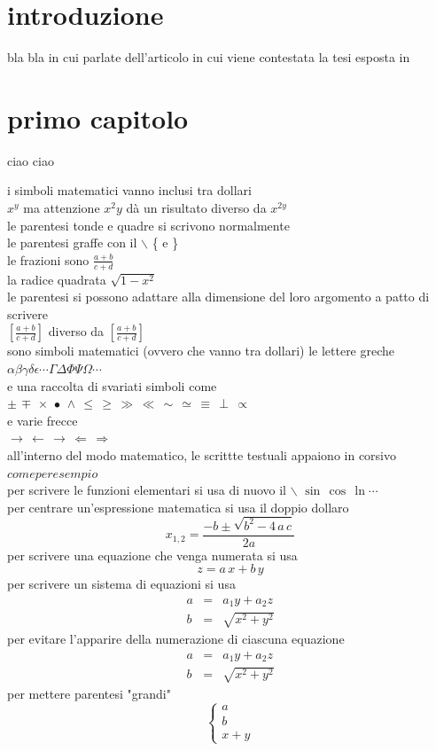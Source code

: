 \documentclass[12pt]{article}
\newcommand{\bea}{\begin{eqnarray}}
\newcommand{\eea}{\end{eqnarray}}
\begin{document}
\section{introduzione}
bla bla
in cui parlate dell'articolo \cite{paper1} in cui viene contestata la tesi
esposta in \cite{paper2}

\clearpage
\section{primo capitolo}
\label{mathsimbol}
ciao ciao 

i simboli matematici vanno inclusi tra dollari \\
$x^y$ ma attenzione $x^2y$ d\`a un risultato diverso da $x^{2y}$\\
le parentesi tonde e quadre si scrivono normalmente\\
le parentesi graffe con il $\backslash$ \{ e \}\\
le frazioni sono $\frac{a+b}{c+d}$\\
la radice quadrata $\sqrt{1-x^2}$\\
le parentesi si possono adattare alla dimensione del loro argomento
a patto di scrivere\\
$\left[ \frac{a+b}{c+d} \right]$ 
diverso da
$[ \frac{a+b}{c+d} ]$ \\
sono simboli matematici (ovvero che vanno tra dollari) le lettere greche\\
$\alpha\beta\gamma\delta\epsilon\cdots\Gamma\Delta\Phi\Psi\Omega\cdots$\\
e una raccolta di svariati simboli come\\
$\pm\,\mp\,\times\,\bullet\,\wedge\,\leq\,\geq\,\gg\,\ll\,\sim\,\simeq
\,\equiv\,\perp\,\propto$\\
e varie frecce\\
$\to\,\leftarrow\,\rightarrow\,\Leftarrow\,\Rightarrow$\\
all'interno del modo matematico, le scrittte testuali appaiono in corsivo
$come per esempio$ \\
per scrivere le funzioni elementari si usa di nuovo il $\backslash$
$\sin\,\cos\,\ln\cdots$\\
per centrare un'espressione matematica si usa il doppio dollaro
$$
x_{1,2} = \frac{-b\pm\sqrt{b^2-4\,a\,c}}{2a}
$$
per scrivere una equazione che venga numerata si usa
\begin{equation}
z=a\, x + b\, y
\end{equation}
per scrivere un sistema di equazioni si usa
\begin{eqnarray}
a &=& a_1 y + a_2 z \\
b &=& \sqrt{x^2+y^2}\label{secondaeq}
\end{eqnarray}
per evitare l'apparire della numerazione di ciascuna equazione
\bea
a &=& a_1 y + a_2 z \nonumber\\
b &=& \sqrt{x^2+y^2}\nonumber
\eea
per mettere parentesi "grandi"\\
$$
\left\{
\begin{array}{c}
a\\
b\\
x+y
\end{array}
\right.
$$
\end{document}
